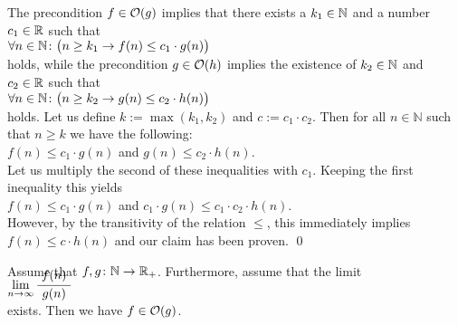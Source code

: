 \proof
The precondition $f \in \mathcal{O}(g)$ implies that there exists a $k_1 \in {\mathbb N}$ and a number $c_1 \in {\mathbb R}$
such that 
\\[0.2cm]
\hspace*{1.3cm} 
$\forall n \in {\mathbb N} \colon\bigl( n \geq k_1 \rightarrow f(n) \leq c_1 \cdot g(n)\bigr)$ 
\\[0.2cm]
holds, while the precondition $g \in \mathcal{O}(h)$ implies the existence of $k_2 \in {\mathbb N}$ and $c_2 \in {\mathbb R}$
such that \\[0.2cm]
\hspace*{1.3cm} 
$\forall n \in {\mathbb N} \colon\bigl( n \geq k_2 \rightarrow g(n) \leq c_2 \cdot h(n)\bigr)$ 
\\[0.2cm]
holds.  Let us define $k:= \max(k_1,k_2)$ and $c := c_1 \cdot c_2$.  Then for all $n \in \mathbb{N}$
such that $n \geq k$ we have the following:
\\[0.2cm]
\hspace*{1.3cm}
$f(n) \leq c_1\cdot g(n)$ \quad and \quad $g(n) \leq c_2 \cdot h(n)$. 
\\[0.2cm]
Let us multiply the second of these inequalities with $c_1$.  Keeping the first inequality this yields
\\[0.2cm]
\hspace*{1.3cm}
$f(n) \leq c_1\cdot g(n)$  \quad and \quad $c_1\cdot g(n) \leq c_1\cdot c_2 \cdot h(n)$. 
\\[0.2cm]
However, by the transitivity of the relation $\leq$, this immediately implies $f(n) \leq c \cdot h(n)$ and our
claim has been proven.  
\qed

\begin{Proposition} \label{limit}
  Assume that $f,g \colon {\mathbb N} \rightarrow {{\mathbb R}_+}$.   Furthermore, assume that the limit 
  \\[0.2cm]
  \hspace*{3.3cm}
 $\lim\limits_{n \rightarrow \infty} \bruch{\,f(n)\,}{g(n)}$
  \\[0.2cm]
  exists.  Then we have $f \in \mathcal{O}(g)$. 
\end{Proposition}

